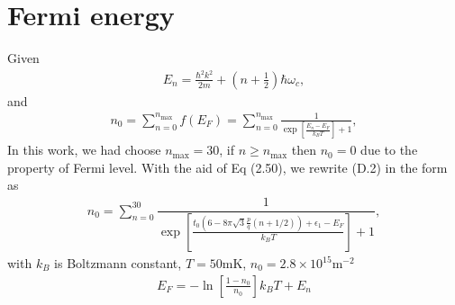 \documentclass{report}
\newcommand{\f}[2]{\dfrac{#1}{#2}}
\begin{document}
\chapter{Fermi energy}
Given
\begin{gather}
	E_{n} = \frac{\hbar^{2} k^{2}}{2m} + \left(n + \frac{1}{2}\right) \hbar \omega_{c},
\end{gather}
and
\begin{gather}
	n_{0} = \sum_{n=0}^{n_{\text{max}}} f(E_{F}) = \sum_{n=0}^{n_{\text{max}}} \tfrac{1}{\exp[\frac{E_{n} - E_{F}}{k_{B}T}] + 1},
\end{gather}
In this work, we had choose $n_{\text{max}} = 30$, if $n \geq n_{\text{max}}$ then $n_{0} = 0$ due to the property of Fermi level. With the aid of Eq (2.50), we rewrite (D.2) in the form as
\begin{gather}
	n_{0} = \sum_{n = 0}^{30} \f{1}{\exp[\frac{t_{0} \left(6 - 8\pi\sqrt{3} \frac{p}{q}( n + 1 /2)\right) + \epsilon_{1} - E_{F}}{k_{B} T}] + 1},
\end{gather}
with $k_{B}$ is Boltzmann constant, $T= 50$mK, $n_{0} = 2.8\times10^{15}$m$^{-2}$
\begin{equation}
	\begin{aligned}
		E_{F} = - \ln\left[\frac{1-n_{0}}{n_{0}}\right] k_{B}T + E_{n}
	\end{aligned}
\end{equation}








\end{document}
